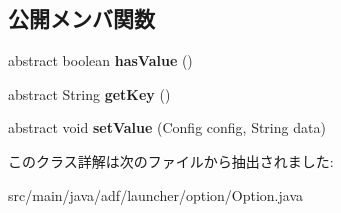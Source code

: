 \subsection*{公開メンバ関数}
\begin{DoxyCompactItemize}
\item 
\hypertarget{classadf_1_1launcher_1_1option_1_1Option_ad5329cdcad9238d6b87e240032824027}{}\label{classadf_1_1launcher_1_1option_1_1Option_ad5329cdcad9238d6b87e240032824027} 
abstract boolean {\bfseries has\+Value} ()
\item 
\hypertarget{classadf_1_1launcher_1_1option_1_1Option_a431b4045399a237a4e425e7525552847}{}\label{classadf_1_1launcher_1_1option_1_1Option_a431b4045399a237a4e425e7525552847} 
abstract String {\bfseries get\+Key} ()
\item 
\hypertarget{classadf_1_1launcher_1_1option_1_1Option_a10c349e32a8cce2828fbc71ab3027bd5}{}\label{classadf_1_1launcher_1_1option_1_1Option_a10c349e32a8cce2828fbc71ab3027bd5} 
abstract void {\bfseries set\+Value} (Config config, String data)
\end{DoxyCompactItemize}


このクラス詳解は次のファイルから抽出されました\+:\begin{DoxyCompactItemize}
\item 
src/main/java/adf/launcher/option/Option.\+java\end{DoxyCompactItemize}
